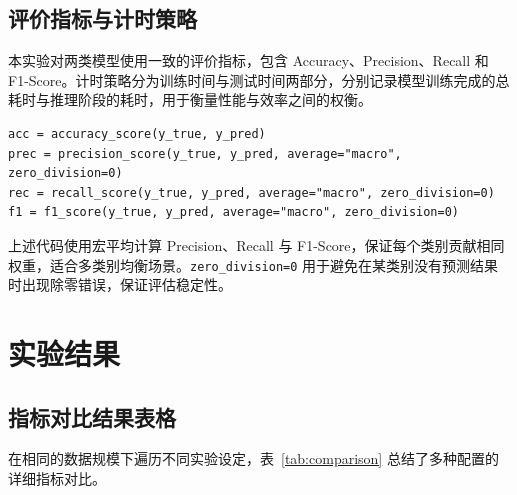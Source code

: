\documentclass[runningheads]{ctexart}
\begin{document}
\subsection{评价指标与计时策略}
本实验对两类模型使用一致的评价指标，包含 Accuracy、Precision、Recall 和 F1-Score。计时策略分为训练时间与测试时间两部分，分别记录模型训练完成的总耗时与推理阶段的耗时，用于衡量性能与效率之间的权衡。

\begin{lstlisting}
acc = accuracy_score(y_true, y_pred)
prec = precision_score(y_true, y_pred, average="macro", zero_division=0)
rec = recall_score(y_true, y_pred, average="macro", zero_division=0)
f1 = f1_score(y_true, y_pred, average="macro", zero_division=0)
\end{lstlisting}
上述代码使用宏平均计算 Precision、Recall 与 F1-Score，保证每个类别贡献相同权重，适合多类别均衡场景。\texttt{zero\_division=0} 用于避免在某类别没有预测结果时出现除零错误，保证评估稳定性。

\section{实验结果}
\subsection{指标对比结果表格}
在相同的数据规模下遍历不同实验设定，表~\ref{tab:comparison} 总结了多种配置的详细指标对比。

\begin{table}[H]
    \centering
    \caption{分类算法（CNN 与 RF）全面指标结果对比表}\label{tab:comparison}
\end{table}
\end{document}
